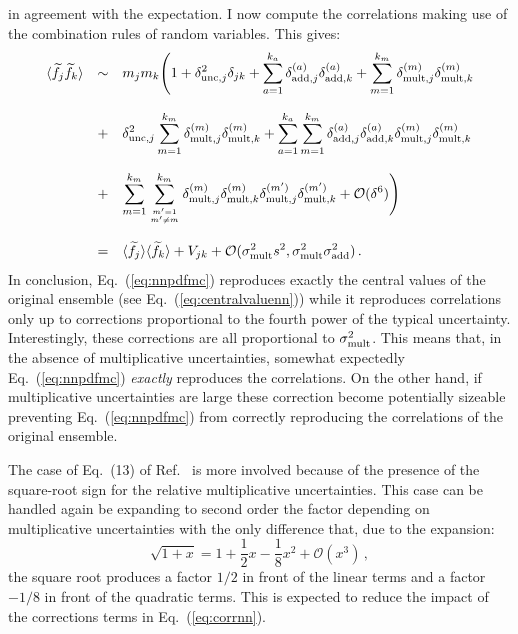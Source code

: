 \documentclass[10pt,a4paper]{article}
\begin{document}
in agreement with the expectation. I now compute the correlations
making use of the combination rules of random variables. This gives:
\begin{equation}\label{eq:corrnn}
\begin{array}{rcl}
  \langle \widetilde{f}_j \widetilde{f}_k\rangle&\sim&\displaystyle m_jm_k\Bigg(1+\delta_{{\rm unc},j}^2\delta_{jk}+\sum_{a=1}^{k_a} \delta_{{\rm add},j}^{(a)}\delta_{{\rm add},k}^{(a)} +\sum_{m=1}^{k_m}\delta_{{\rm mult},j}^{(m)}\delta_{{\rm mult},k}^{(m)}\\
\\
&+&\displaystyle\delta_{{\rm unc},j}^2 \sum_{m=1}^{k_m} \delta_{{\rm mult},j}^{(m)}\delta_{{\rm  mult},k}^{(m)}
  +\sum_{a=1}^{k_a} \sum_{m=1}^{k_m}\delta_{{\rm add},j}^{(a)}\delta_{{\rm add},k}^{(a)} \delta_{{\rm mult},j}^{(m)} \delta_{{\rm mult},k}^{(m)} \\
\\
&+&\displaystyle \sum_{m=1}^{k_m}\sum_{m'=1\atop m'\neq m}^{k_m}\delta_{{\rm
      mult},j}^{(m)}\delta_{{\rm
      mult},k}^{(m)}\delta_{{\rm mult},j}^{(m')}\delta_{{\rm
    mult},k}^{(m')}+\mathcal{O}(\delta^6)\Bigg)\\
\\
&=&\displaystyle \langle \widetilde{f}_j\rangle \langle
    \widetilde{f}_k\rangle +V_{jk}+\mathcal{O}(\sigma_{\rm mult}^2 s^2, \sigma_{\rm mult}^2 \sigma_{\rm add}^2)\,.
\end{array}
\end{equation}
In conclusion, Eq.~(\ref{eq:nnpdfmc}) reproduces exactly the central
values of the original ensemble (see Eq.~(\ref{eq:centralvaluenn}))
while it reproduces correlations only up to corrections proportional
to the fourth power of the typical uncertainty. Interestingly, these
corrections are all proportional to $\sigma_{\rm mult}^2$. This means
that, in the absence of multiplicative uncertainties, somewhat
expectedly Eq.~(\ref{eq:nnpdfmc}) \textit{exactly} reproduces the
correlations. On the other hand, if multiplicative uncertainties are
large these correction become potentially sizeable preventing
Eq.~(\ref{eq:nnpdfmc}) from correctly reproducing the correlations of
the original ensemble.

The case of Eq.~(13) of Ref.~\cite{Ball:2008by} is more involved
because of the presence of the square-root sign for the relative
multiplicative uncertainties. This case can be handled again be
expanding to second order the factor depending on multiplicative
uncertainties with the only difference that, due to the expansion:
\begin{equation}
  \sqrt{1+x}=1+\frac12x-\frac18x^2+\mathcal{O}(x^3)\,,
\end{equation}
the square root produces a factor $1/2$ in front of the linear terms
and a factor $-1/8$ in front of the quadratic terms. This is expected
to reduce the impact of the corrections terms in
Eq.~(\ref{eq:corrnn}).
\end{document}
